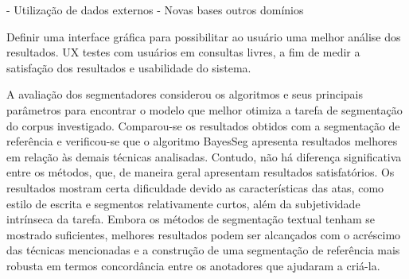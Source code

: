 	- Utilização de dados externos
	- Novas bases outros domínios



Definir uma interface gráfica para possibilitar ao usuário
uma melhor análise dos resultados. {UX} testes com usuários em consultas livres, a fim de medir a satisfação dos resultados e usabilidade do sistema.













































A avaliação dos segmentadores considerou os algoritmos e seus principais parâmetros para encontrar o modelo que melhor otimiza a tarefa de segmentação do corpus investigado. Comparou-se os resultados obtidos com a segmentação de referência e verificou-se que o algoritmo BayesSeg apresenta resultados melhores em relação às demais técnicas analisadas. Contudo, não há diferença significativa entre os métodos, que,  de maneira geral apresentam resultados satisfatórios.  
Os resultados mostram certa dificuldade devido as características das atas, como estilo de escrita e segmentos relativamente curtos, além da subjetividade intrínseca da tarefa.
Embora os métodos de segmentação textual tenham se mostrado suficientes, melhores resultados podem ser alcançados com o acréscimo das técnicas mencionadas e a construção de uma segmentação de referência mais robusta em termos concordância entre os anotadores que ajudaram a criá-la.


